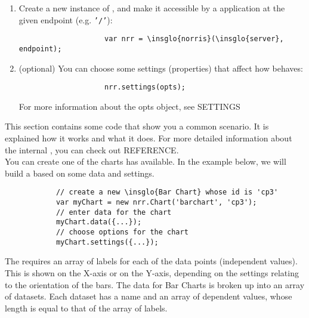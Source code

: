 \begin{itemize}
\begin{enumerate}
\begin{lstlisting}
					var \insglo{norris} = require('\insglo{norris}');
				\end{lstlisting}
				\item Create a new instance of , and make it accessible by a  application at the given endpoint (e.g. \texttt{'/'}):
				\begin{lstlisting}
					var nrr = \insglo{norris}(\insglo{server}, endpoint);
				\end{lstlisting}
				\item (optional) You can choose some settings (properties) that affect how  behaves:
				\begin{lstlisting}
					nrr.settings(opts);
				\end{lstlisting}
				For more information about the opts object, see  SETTINGS
			\end{enumerate}
		\end{itemize}
		This section contains some code that show you a common scenario. It is explained how it works and what it does. For more detailed information about the internal , you can check out  REFERENCE.\\
		You can create one of the charts  has available. In the example below, we will build a  based on some data and settings.
		\begin{lstlisting}
			// create a new \insglo{Bar Chart} whose id is 'cp3'
			var myChart = new nrr.Chart('barchart', 'cp3');
			// enter data for the chart
			myChart.data({...});
			// choose options for the chart
			myChart.settings({...});
		\end{lstlisting}
			The  requires an array of labels for each of the data points (independent values). This is shown on the X-axis or on the Y-axis, depending on the settings relating to the orientation of the bars. The data for Bar Charts is broken up into an array of datasets. Each dataset has a name and an array of dependent values, whose length is equal to that of the array of labels.